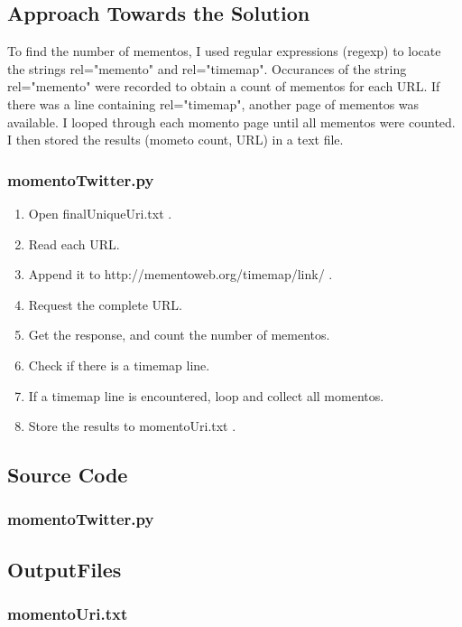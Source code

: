\documentclass[12pt]{article}
\begin{document}
\subsection{Approach Towards the Solution}
To find the number of mementos, I used regular expressions (regexp) to locate the strings rel="memento" and rel="timemap". Occurances of the string rel="memento" were recorded to obtain a count of mementos for each URL. If there was a line containing rel="timemap", another page of mementos was available. I looped through each momento page until all mementos were counted. I then stored the results (mometo count, URL) in a text file.
\subsubsection{momentoTwitter.py}
\begin{enumerate}
	\item Open finalUniqueUri.txt .
	\item Read each URL.
	\item Append it to http://mementoweb.org/timemap/link/ .
	\item Request the complete URL.
	\item Get the response, and count the number of mementos.
	\item Check if there is a timemap line.
	\item If a timemap line is encountered, loop and collect all  momentos.
	\item Store the results to momentoUri.txt .
\end{enumerate}
\newpage
\subsection{Source Code}
\subsubsection{momentoTwitter.py}

\newpage
\subsection{OutputFiles}
\subsubsection{momentoUri.txt}

\newpage
\end{document}
